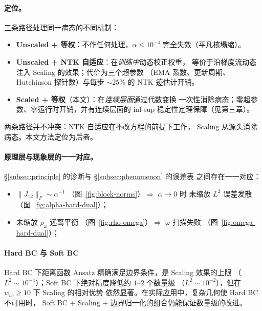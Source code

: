 \documentclass{xmu}
\theoremstyle{plain}
\theoremstyle{remark}
\begin{document}
\paragraph{定位。}
三条路径处理同一病态的不同机制：
\begin{itemize}
  \item \textbf{Unscaled + 等权}：不作任何处理，$\alpha\le 10^{-4}$
        完全失效（平凡核塌缩）。
  \item \textbf{Unscaled + NTK 自适应}：在\emph{训练中}动态校正权重，
        等价于沿梯度流动态注入 Scaling 的效果；代价为三个超参数
        （EMA 系数、更新周期、Hutchinson 探针数）与每步
        $\sim 25\%$ 的 NTK 迹估计开销。
  \item \textbf{Scaled + 等权}（本文）：在\emph{连续层面}通过代数变换
        一次性消除病态；零超参数、零运行时开销，并有连续层面的
        inf-sup 稳定性定理保障（见第三章）。
\end{itemize}
两条路径并不冲突：NTK 自适应在不改方程的前提下工作，
Scaling 从源头消除病态。本文方法定位为后者。


\label{subsec:synthesis}

\paragraph{原理层与现象层的一一对应。}
§\ref{subsec:principle} 的诊断与 §\ref{subsec:phenomenon} 的误差表
之间存在一一对应：
\begin{itemize}
  \item $\|J_{12}\|_F\sim\alpha^{-1}$
        （图~\ref{fig:block-norms}）$\Rightarrow$ $\alpha\to 0$ 时
        未缩放 $L^2$ 误差发散（图~\ref{fig:alpha-hard-dual}）；
  \item 未缩放 $\rho_\omega$ 远离平衡
        （图~\ref{fig:rho-omega}）$\Rightarrow$ $\omega$-扫描失败
        （图~\ref{fig:omega-hard-dual}）；
        
\end{itemize}

\paragraph{Hard BC 与 Soft BC}
Hard BC 下距离函数 Ansatz 精确满足边界条件，是 Scaling 效果的上限
（$L^2\sim 10^{-4}$）；Soft BC 下绝对精度降低约 $1$--$2$ 个数量级
（$L^2\sim 10^{-2}$），但在 $w_{bc}\ge 10$ 下 Scaling 的相对优势
依然显著。在实际应用中，复杂几何使 Hard BC 不可用时，
Soft BC + Scaling + 边界归一化的组合仍能保证数量级的改进。
\end{document}
